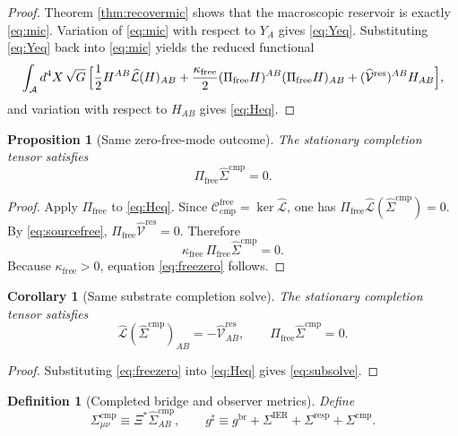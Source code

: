 \documentclass[11pt]{article}
\newcommand{\Sub}{\mathcal A}
\newcommand{\ObserverMap}{\Xi}
\newcommand{\ObserverMetric}{g^{\mathrm{br}}}
\newcommand{\CompletedMetric}{g^{\sharp}}
\newcommand{\BaseShift}{\Sigma^{\mathrm{IER}}}
\newcommand{\ResponseShift}{\Sigma^{\mathrm{resp}}}
\newcommand{\CompShift}{\Sigma^{\mathrm{cmp}}}
\newcommand{\CompLift}{\widehat\Sigma^{\mathrm{cmp}}}
\newcommand{\ResidualLift}{\widehat{\mathcal V}^{\mathrm{res}}}
\newcommand{\SubReducedEin}{\widehat{\mathcal L}}
\newcommand{\FreeProj}{\Pi_{\mathrm{free}}}
\newcommand{\GaugeAux}{Y}
\newcommand{\CompFree}{\mathscr C_{\mathrm{cmp}}^{\mathrm{free}}}
\newcommand{\FreeStiff}{\kappa_{\mathrm{free}}}
\newtheorem{definition}{Definition}
\newtheorem{proposition}{Proposition}
\newtheorem{corollary}{Corollary}
\begin{document}
\begin{proof}
Theorem \ref{thm:recovermic} shows that the macroscopic reservoir is exactly \eqref{eq:mic}. Variation of \eqref{eq:mic} with respect to \(\GaugeAux_A\) gives \eqref{eq:Yeq}. Substituting \eqref{eq:Yeq} back into \eqref{eq:mic} yields the reduced functional
\[
\int_{\Sub} d^4X\,\sqrt{G}\,
\Bigl[
\frac12 H^{AB}\SubReducedEin(H)_{AB}
+\frac{\FreeStiff}{2}(\FreeProj H)^{AB}(\FreeProj H)_{AB}
+(\ResidualLift)^{AB}H_{AB}
\Bigr],
\]
and variation with respect to \(H_{AB}\) gives \eqref{eq:Heq}.
\end{proof}

\begin{proposition}[Same zero-free-mode outcome]
\label{prop:freezero}
The stationary completion tensor satisfies
\begin{equation}
\FreeProj\CompLift=0.
\label{eq:freezero}
\end{equation}
\end{proposition}

\begin{proof}
Apply \(\FreeProj\) to \eqref{eq:Heq}. Since \(\CompFree=\ker\SubReducedEin\), one has \(\FreeProj\SubReducedEin(\CompLift)=0\). By \eqref{eq:sourcefree}, \(\FreeProj\ResidualLift=0\). Therefore
\[
\FreeStiff\,\FreeProj\CompLift=0.
\]
Because \(\FreeStiff>0\), equation \eqref{eq:freezero} follows.
\end{proof}

\begin{corollary}[Same substrate completion solve]
\label{cor:subsolve}
The stationary completion tensor satisfies
\begin{equation}
\SubReducedEin(\CompLift)_{AB}
=
-\ResidualLift_{AB},
\qquad
\FreeProj\CompLift=0.
\label{eq:subsolve}
\end{equation}
\end{corollary}

\begin{proof}
Substituting \eqref{eq:freezero} into \eqref{eq:Heq} gives \eqref{eq:subsolve}.
\end{proof}

\begin{definition}[Completed bridge and observer metrics]
\label{def:completed}
Define
\begin{equation}
\CompShift_{\mu\nu}
\equiv
\ObserverMap^*\CompLift_{AB},
\qquad
\CompletedMetric
\equiv
\ObserverMetric+\BaseShift+\ResponseShift+\CompShift.
\label{eq:completedmetric}
\end{equation}
\end{definition}
\end{document}
